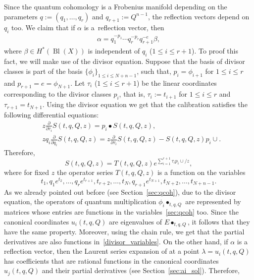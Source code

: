 \documentclass[10pt,a4paper]{article}
\numberwithin{equation}{section}
\begin{document}
Since the quantum cohomology is a Frobenius manifold depending on the parameters $q:=(q_1,\dots,q_r)$ and $q_{r+1}:=Q^{n-1}$, the reflection vectors depend on $q_i$ too. We claim that if $\alpha$ is a~reflection vector, then
\begin{gather}\label{refl:q_dep}
\alpha=q_1^{-p_1}\cdots q_r^{-p_r} q_{r+1}^{- e}\beta,
\end{gather}
where $\beta\in H^*(\operatorname{Bl}(X))$ is independent of
$q_i$ ($1\leq i\leq r+1$). To proof this fact, we will make use of the divisor equation. Suppose that the basis of divisor classes is part of the basis $\{\phi_i\}_{1\leq i\leq N+n-1}$, such that, $p_i=\phi_{i+1}$ for $1\leq i\leq r$ and $p_{r+1}= e = \phi_{N+1}$. Let $\tau_i$ ($1\leq i\leq r+1$) be the linear coordinates corresponding to the divisor classes $p_i$, that is, $\tau_i:=t_{i+1}$ for $1\leq i\leq r$ and $\tau_{r+1}=t_{N+1}$. Using the divisor equation we get that the calibration satisfies the following differential equations:
\begin{align*}
&z\frac{\partial}{\partial \tau_i}S(t,q,Q,z)=
p_i\bullet S(t,q,Q,z),\\
&zq_i\frac{\partial}{\partial q_i}S(t,q,Q,z)=
z\frac{\partial}{\partial \tau_i}S(t,q,Q,z)-S(t,q,Q,z)p_i\cup.
\end{align*}
Therefore,
\[
S(t,q,Q,z)=T(t,q,Q,z)e^{\sum^{r+1}_{i=1}\tau_i p_i\cup /z},
\]
 where
for fixed $z$ the operator series $T(t,q,Q,z)$ is a function on the variables
\begin{equation}\label{divisor_variables}
t_1, q_1e^{t_2},\dots, q_r e^{t_{r+1}}, t_{r+2}, \dots, t_N,
q_{r+1} e^{t_{N+1}}, t_{N+2},\dots, t_{N+n-1}.
\end{equation}
As we already pointed out before (see Section~\ref{sec:qcoh}), due to the divisor equation, the operators of quantum multiplication $\phi_i\bullet_{t,q,Q}$ are represented by matrices whose entries are functions in the variables~\eqref{sec:qcoh} too. Since the canonical coordinates $u_i(t,q,Q)$ are eigenvalues of $E\bullet_{t,q,Q}$, it follows that they have the same property. Moreover, using the chain rule, we get that the partial derivatives  are also functions in~\eqref{divisor_variables}. On the other hand, if $\alpha$ is a reflection vector, then the Laurent series expansion of  at a point $\lambda=u_i(t,q,Q)$ has coefficients that are rational functions in the canonical coordinates $u_j(t,q,Q)$ and their partial derivatives
 (see Section~\ref{sec:ai_sol}). Therefore,
\end{document}
